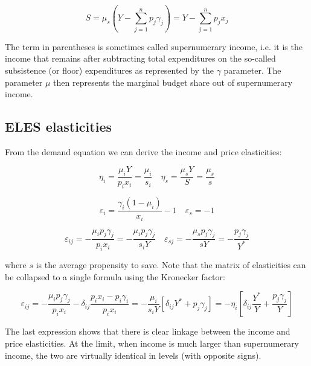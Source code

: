 \begin{equation}
\label{eq:ELESSAV}
S = \mu_s \left( Y - \sum\limits_{j = 1}^n {p_j \gamma_j } \right) =
   Y - \sum\limits_{j = 1}^n {p_j  x_j}
\end{equation}

The term in parentheses is sometimes called supernumerary income, i.e. it is the income that
remains after subtracting total expenditures on the so-called subsistence (or floor) expenditures
as represented by the $\gamma$  parameter. The parameter $\mu$ then represents the marginal budget
share out of supernumerary income.

\subsection{ELES elasticities}

From the demand equation we can derive the income and price elasticities:

\begin{equation}
\label{eq:ELESINCELAS}
\eta_i = \frac {\mu_i {Y}} {p_i x_i} = \frac {\mu _i} {s_i}   \quad
   \eta _s = \frac {\mu_s {Y}} {S} = \frac{ \mu_s} {s}
\end{equation}

\begin{equation}
\label{eq:ELESOWNPELAS}
\varepsilon_i = \frac {\gamma_i \left( 1 - \mu _i \right)} {x_i} - 1   \quad
   \varepsilon_s =  - 1
\end{equation}

\begin{equation}
\label{eq:ELESXPELAS}
\varepsilon_{ij} =  - \frac {\mu_i p_j \gamma_j } {p_i x_i} =
   - \frac{\mu_i p_j \gamma_j } {s_i Y}   \quad
   \varepsilon_{sj} =  - \frac{\mu_s p_j \gamma_j } {sY} =
      - \frac{p_j \gamma_j } {Y^*}
\end{equation}

\noindent where $s$ is the average propensity to save. Note that the matrix of elasticities can be
collapsed to a single formula using the Kronecker factor:

\begin{equation}
\label{eq:ELESPELAS}
\varepsilon_{ij} = -\frac{\mu_i p_j \gamma_j}{p_i x_i} -
      \delta_{ij} \frac{p_i x_i - p_i \gamma_i}{p_i x_i}  =
   - \frac{\mu_i} {s_i Y} \left[ \delta_{ij} Y^* + p_j \gamma _j \right] =
   - \eta_i \left[ \delta_{ij} \frac{Y^*}{Y} + \frac{p_j \gamma _j}{Y} \right]
\end{equation}

\noindent The last expression shows that there is clear linkage between the income and price
elasticities. At the limit, when income is much larger than supernumerary income, the two
are virtually identical in levels (with opposite signs).

